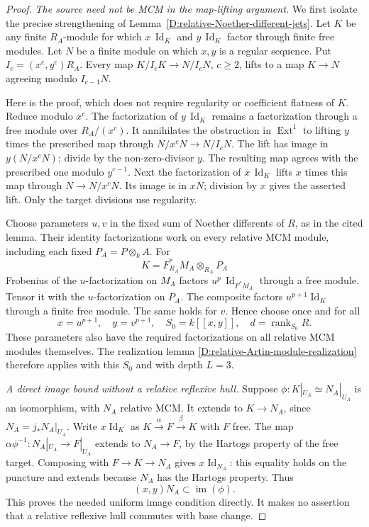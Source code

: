 \begin{proof}
\emph{The source need not be MCM in the map-lifting argument.}
We first isolate the precise strengthening of
Lemma~\ref{D:relative-Noether-different-jets}.
Let $K$ be any finite $R_A$-module for which
$x\,\operatorname{Id}_K$ and $y\,\operatorname{Id}_K$
factor through finite free modules.  Let $N$ be a finite
module on which $x,y$ is a regular sequence.  Put
$I_c=(x^c,y^c)R_A$.  Every map
$K/I_cK\to N/I_cN$, $c\ge2$, lifts to a map $K\to N$
agreeing modulo $I_{c-1}N$.

Here is the proof, which does not require regularity
or coefficient flatness of $K$.  Reduce modulo $x^c$.
The factorization of $y\,\operatorname{Id}_K$ remains
a factorization through a free module over $R_A/(x^c)$.
It annihilates the obstruction in $\operatorname{Ext}^1$
to lifting $y$ times the prescribed map through
$N/x^cN\to N/I_cN$.  The lift has image in
$y(N/x^cN)$; divide by the non-zero-divisor $y$.
The resulting map agrees with the prescribed one
modulo $y^{c-1}$.  Next the factorization of
$x\,\operatorname{Id}_K$ lifts $x$ times this map
through $N\to N/x^cN$.  Its image is in $xN$;
division by $x$ gives the asserted lift.
Only the target divisions use regularity.

Choose parameters $u,v$ in the fixed sum of Noether
differents of $R$, as in the cited lemma.  Their
identity factorizations work on every relative MCM
module, including each fixed $P_A=P\otimes_kA$.
For
\[
                          K=F_{R_A}^*M_A\otimes_{R_A}P_A
\]
Frobenius of the $u$-factorization on $M_A$
factors $u^p\,\operatorname{Id}_{F^*M_A}$ through
a free module.  Tensor it with the $u$-factorization
on $P_A$.  The composite factors
$u^{p+1}\operatorname{Id}_K$ through a finite
free module.  The same holds for $v$.
Hence choose once and for all
\[
       x=u^{p+1},\quad y=v^{p+1},\quad
       S_0=k[[x,y]],\quad d=\operatorname{rank}_{S_0}R.
                                                        \tag{D.LBZ.7}
\]
These parameters also have the required factorizations
on all relative MCM modules themselves.  The realization
lemma \ref{D:relative-Artin-module-realization} therefore
applies with this $S_0$ and with depth $L=3$.

\emph{A direct image bound without a relative reflexive hull.}
Suppose $\phi:K|_{U_A}\simeq N_A|_{U_A}$ is an
isomorphism, with $N_A$ relative MCM.  It extends
to $K\to N_A$, since $N_A=j_*N_A|_{U_A}$.
Write $x\operatorname{Id}_K$ as
$K\xrightarrow{\alpha}F\xrightarrow{\beta}K$
with $F$ free.  The map
$\alpha\phi^{-1}:N_A|_{U_A}\to F|_{U_A}$
extends to $N_A\to F$, by the Hartogs property of
the free target.  Composing with
$F\to K\to N_A$ gives $x\operatorname{Id}_{N_A}$:
this equality holds on the puncture and extends
because $N_A$ has the Hartogs property.
Thus
\[
               (x,y)N_A\subset\operatorname{im}(\phi).
                                                        \tag{D.LBZ.8}
\]
This proves the needed uniform image condition
directly.  It makes no assertion that a relative
reflexive hull commutes with base change.


\end{proof}
